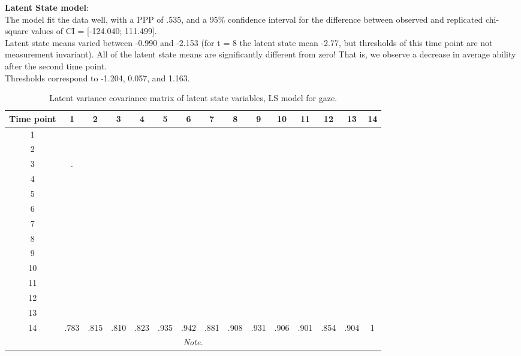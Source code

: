 \textbf{Latent State model}: \\
The model fit the data well, with a PPP of .535, and a 95\% confidence interval for the difference between observed and replicated chi-square values of CI =  [-124.040; 111.499]. \\
Latent state means varied between -0.990 and -2.153  (for t = 8 the latent state mean -2.77, but thresholds of this time point are not measurement invariant). All of the latent state means are significantly different from zero! That is, we observe a decrease in average ability after the second time point. \\
Thresholds correspond to  -1.204, 0.057, and 1.163. \\

\begin{table}[H]
 \setlength{\tabcolsep}{1mm}
 \begin{center}
        \caption[Correlation latent State gaze]{Latent variance covariance matrix of latent state variables, LS model for gaze.}
        \label{Tab: correlations LS gaze}
            {\footnotesize
            \begin{tabular}{ccccccccccccccc}
            \hline     
           Time point  & 1 &2&3&4&5&6&7&8&9&10&11&12&13&14 \\
           \hline
           1 & &&&&&&&&&&&&& \\
           2 & &&&&&&&&&&&&& \\
           3 & .&&&&&&&&&&&&& \\
           4 &&&&&&&&&&&&&& \\
           5 & &&&&&&&&&&&&& \\
           6 &&&&&&&&&&&&&& \\
           7 & &&&&&&&&&&&&& \\
            8 & &&&&&&&&&&&&& \\
            9 & &&&&&&&&&&&&& \\
           10 & &&&&&&&&&&&&& \\
           11 &&&&&&&&&&&&&& \\
           12 &&&&&&&&&&&&&& \\
            13 & &&&&&&&&&&&&& \\
            14 & .783&.815&.810&.823&.935&.942&.881&.908&.931&.906&.901&.854&.904&1 \\
 \hline 
\multicolumn{15}{p{0.65\textwidth}}{\scriptsize{\textit{Note.}}} \\
            \end{tabular}}
        \end{center}
        \end{table}

